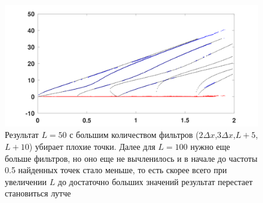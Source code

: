 \documentclass{article}
\begin{document}
	\begin{figure}[!h]
		\begin{center}
			\includegraphics[width=0.9\linewidth]{images/matrix_pencil_method/2dx_2L_filter_L_50.png}
			\caption{Результат $L=50$ с большим количеством фильтров ($2\Delta x$,$3 \Delta x$,$L+5$,$L+10$) убирает плохие точки. Далее для $L=100$ нужно еще больше фильтров, но оно еще не вычленилось и в начале до частоты 0.5 найденных точек стало меньше, то есть скорее всего при увеличении $L$ до достаточно больших значений результат перестает становиться лутче}
		\end{center}
	\end{figure}
\end{document}
